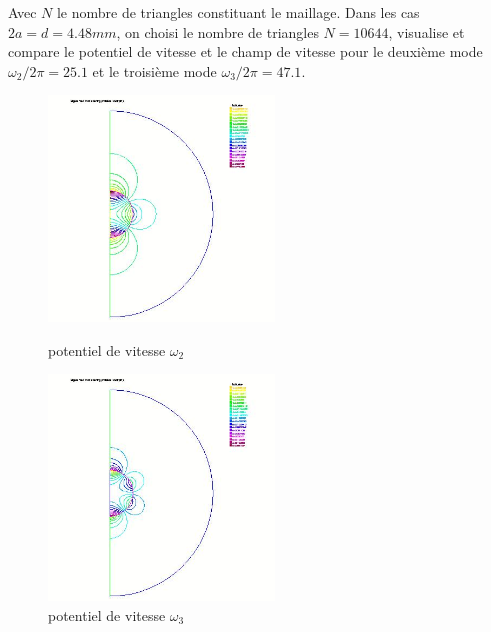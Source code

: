 \documentclass[a4paper]{report}
\begin{document}
Avec $N$ le nombre de triangles constituant le maillage.
\newpage
Dans les cas $2a = d = 4.48 mm$, on choisi le nombre de triangles $N = 10644$, visualise et compare le potentiel de vitesse et le champ de vitesse pour le deuxième mode $\omega_2/2\pi = 25.1$ et le troisième mode $\omega_3/2\pi = 47.1$.
\begin{figure}
\begin{minipage}[!htbp]{0.5\linewidth}
\centering
\includegraphics[width=6cm]{3_3_1_potentiel_de_vitesse_2.jpeg}
\caption{potentiel de vitesse $\omega_2$}
\end{minipage}
\begin{minipage}[!htbp]{0.5\linewidth}
\centering
\includegraphics[width=6cm]{3_3_1_potentiel_de_vitesse_3.jpeg}
\caption{potentiel de vitesse $\omega_3$}
\end{minipage}
\end{figure}
\end{document}
